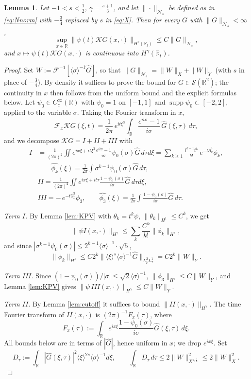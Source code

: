 \documentclass[10pt,a4paper]{amsart}
\newcommand{\F}{\mathcal{F}}
\newcommand{\Kc}{\mathcal{K}}
\newcommand{\R}{\mathbb R}
\newcommand{\ga}{\gamma}
\newcommand{\lan}{\langle}
\newcommand{\pd}{\partial}
\newcommand{\ran}{\rangle}
\newcommand{\sig}{\sigma}
\newcommand{\supp}{\operatorname{supp}}
\theoremstyle{plain}
\newtheorem{lemma}[theorem]{Lemma}
\theoremstyle{remark}
\begin{document}
\begin{lemma}\label{lem:trace}
Let $-1<s<\frac12$, $\ga=\frac{s+1}3$, and let $\|\cdot\|_{\mathcal N_s}$ be defined as in \eqref{eq:Nnorm} with $-\frac34$ replaced by $s$ in \eqref{eq:X}. Then for every $G$ with $\|G\|_{\mathcal N_s}<\infty$,
$$\sup_{x\in\R}\|\psi(t)\Kc G(x,\cdot)\|_{H^\ga(\R_t)}\le C\|G\|_{\mathcal N_s},$$
and $x\mapsto\psi(t)\Kc G(x,\cdot)$ is continuous into $H^\ga(\R_t)$.
\end{lemma}

\begin{proof}
Set $W:=\F^{-1}[\lan\sig\ran^{-1}\widehat G]$, so that $\|G\|_{\mathcal N_s}=\|W\|_{X}+\|W\|_{Y}$ (with $s$ in place of $-\frac34$). By density it suffices to prove the bound for $G\in\mathcal S(\R^2)$; the continuity in $x$ then follows from the uniform bound and the explicit formulas below. Let $\psi_0\in C_c^\infty(\R)$ with $\psi_0=1$ on $[-1,1]$ and $\supp\psi_0\subset[-2,2]$, applied to the variable $\sig$. Taking the Fourier transform in $x$,
$$\mathcal{F}_x {\Kc G}(\xi,t)=\frac{1}{2\pi}\, e^{it\xi^3}\int_\R\frac{e^{it\sig}-1}{i\sig}\,\widehat G(\xi,\tau)\,d\tau ,$$
and we decompose $\Kc G=I+II+III$ with
\begin{align*}
I&=\frac{1}{(2\pi)^2}\iint e^{ix\xi+it\xi^3}\frac{e^{it\sig}-1}{i\sig}\psi_0(\sig)\widehat G\,d\tau d\xi
=\sum_{k\ge1}\frac{i^{k-1}t^k}{k!}\,e^{-t\pd_x^3}\phi_k,\\ 
&\quad \quad \widehat{\phi_k}(\xi)=\frac1{2\pi}\int\sig^{k-1}\psi_0(\sig)\widehat G\,d\tau,\\
&II=\frac{1}{(2\pi)^2}\iint e^{ix\xi+it\tau}\frac{1-\psi_0(\sig)}{i\sig}\widehat G\,d\tau d\xi,\\
&III=-\,e^{-t\pd_x^3}\phi_3,\qquad \widehat{\phi_3}(\xi)=\frac1{2\pi}\int\frac{1-\psi_0(\sig)}{i\sig}\widehat G\,d\tau .
\end{align*}

\emph{Term $I$.} By Lemma \ref{lem:KPV} with $\theta_k=t^k\psi$, $\|\theta_k\|_{H^1}\le C^k$, we get $$\|\psi I(x,\cdot)\|_{H^\ga}\le\sum_k\frac{C^k}{k!}\|\phi_k\|_{H^s},$$ and since $|\sig^{k-1}\psi_0(\sig)|\le 2^{k-1}\lan\sig\ran^{-1}\cdot\sqrt5$,
$$\|\phi_k\|_{H^s}\le C2^{k}\big\|\lan\xi\ran^s\lan\sig\ran^{-1}\widehat G\big\|_{L^2_\xi L^1_\tau}=C2^k\|W\|_Y .$$

\emph{Term $III$.} Since $(1-\psi_0(\sig))/|\sig|\le\sqrt2\lan\sig\ran^{-1}$, $\|\phi_3\|_{H^s}\le C\|W\|_Y$, and Lemma \ref{lem:KPV} gives $\|\psi\, III(x,\cdot)\|_{H^\ga}\le C\|W\|_Y$.

\emph{Term $II$.} By Lemma \ref{lem:cutoff} it suffices to bound $\|II(x,\cdot)\|_{H^\ga}$. The time Fourier transform of $II(x,\cdot)$ is $(2\pi)^{-1}F_x(\tau)$, where
$$F_x(\tau):=\int_\R e^{ix\xi}\frac{1-\psi_0(\sig)}{i\sig}\widehat G(\xi,\tau)\,d\xi .$$
All bounds below are in terms of $|\widehat G|$, hence uniform in $x$; we drop $e^{ix\xi}$. Set
$$D_\tau:=\int_\R|\widehat G(\xi,\tau)|^2\lan\xi\ran^{2s}\lan\sig\ran^{-1}d\xi,\qquad \int_\R D_\tau\,d\tau\le 2\|W\|^2_{X^{s,\frac12}}\le2\|W\|_X^2 .$$


\end{proof}
\end{document}
